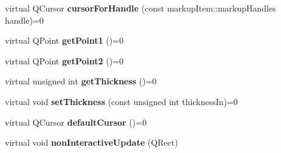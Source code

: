 \begin{DoxyCompactItemize}
\item 
\hypertarget{classmarkupItem_ac16d69f1d757c23535690b06bb04726f}{
virtual QCursor {\bfseries cursorForHandle} (const markupItem::markupHandles handle)=0}
\label{classmarkupItem_ac16d69f1d757c23535690b06bb04726f}

\item 
\hypertarget{classmarkupItem_a2299e864bc5c49bfcc81ec87d42b3fd8}{
virtual QPoint {\bfseries getPoint1} ()=0}
\label{classmarkupItem_a2299e864bc5c49bfcc81ec87d42b3fd8}

\item 
\hypertarget{classmarkupItem_a89ccf6d10aba6fcb7f9500d44a86719b}{
virtual QPoint {\bfseries getPoint2} ()=0}
\label{classmarkupItem_a89ccf6d10aba6fcb7f9500d44a86719b}

\item 
\hypertarget{classmarkupItem_a5c518450291096bb8524ab0547e5e9bc}{
virtual unsigned int {\bfseries getThickness} ()=0}
\label{classmarkupItem_a5c518450291096bb8524ab0547e5e9bc}

\item 
\hypertarget{classmarkupItem_ac843311c19006ec8f1452a159f05c15b}{
virtual void {\bfseries setThickness} (const unsigned int thicknessIn)=0}
\label{classmarkupItem_ac843311c19006ec8f1452a159f05c15b}

\item 
\hypertarget{classmarkupItem_a019daf6e007a2726d766664d2c3cd587}{
virtual QCursor {\bfseries defaultCursor} ()=0}
\label{classmarkupItem_a019daf6e007a2726d766664d2c3cd587}

\item 
\hypertarget{classmarkupItem_aa3059280872d7dba196e97c8de2cc627}{
virtual void {\bfseries nonInteractiveUpdate} (QRect)}
\label{classmarkupItem_aa3059280872d7dba196e97c8de2cc627}

\end{DoxyCompactItemize}
